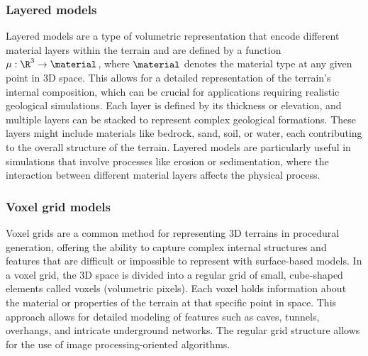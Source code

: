 \subsubsection{Layered models}
Layered models are a type of volumetric representation that encode different material layers within the terrain and are defined by a function $\mu : \R^3 \to \material$, where $\material$ denotes the material type at any given point in 3D space. This allows for a detailed representation of the terrain's internal composition, which can be crucial for applications requiring realistic geological simulations. Each layer is defined by its thickness or elevation, and multiple layers can be stacked to represent complex geological formations. These layers might include materials like bedrock, sand, soil, or water, each contributing to the overall structure of the terrain. Layered models are particularly useful in simulations that involve processes like erosion or sedimentation, where the interaction between different material layers affects the physical process.




\subsubsection{Voxel grid models}
Voxel grids are a common method for representing 3D terrains in procedural generation, offering the ability to capture complex internal structures and features that are difficult or impossible to represent with surface-based models. In a voxel grid, the 3D space is divided into a regular grid of small, cube-shaped elements called voxels (volumetric pixels). Each voxel holds information about the material or properties of the terrain at that specific point in space. This approach allows for detailed modeling of features such as caves, tunnels, overhangs, and intricate underground networks. The regular grid structure allows for the use of image processing-oriented algorithms.


